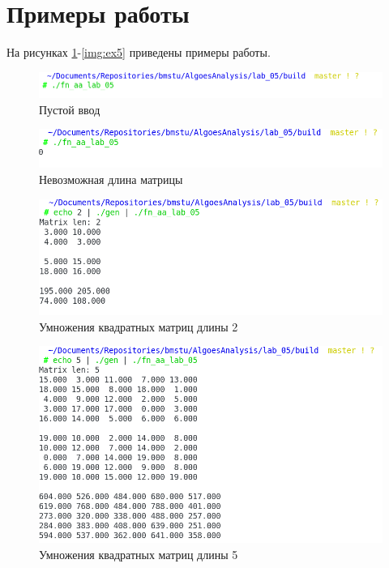 \section{Примеры работы}

На рисунках \ref{img:ex1}-\ref{img:ex5} приведены примеры работы.

\begin{figure}[H]
    \centering
    \includegraphics[scale=0.6]{./images/example1.png}
    \caption{Пустой ввод}
    \label{img:ex1}
\end{figure}

\begin{figure}[H]
    \centering
    \includegraphics[scale=0.6]{./images/example2.png}
    \caption{Невозможная длина матрицы}
    \label{img:ex2}
\end{figure}

\begin{figure}[H]
    \centering
    \includegraphics[scale=0.6]{./images/example3.png}
    \caption{Умножения квадратных матриц длины 2}
    \label{img:ex3}
\end{figure}

\begin{figure}[H]
    \centering
    \includegraphics[scale=0.6]{./images/example4.png}
    \caption{Умножения квадратных матриц длины 5}
    \label{img:ex4}
\end{figure}

